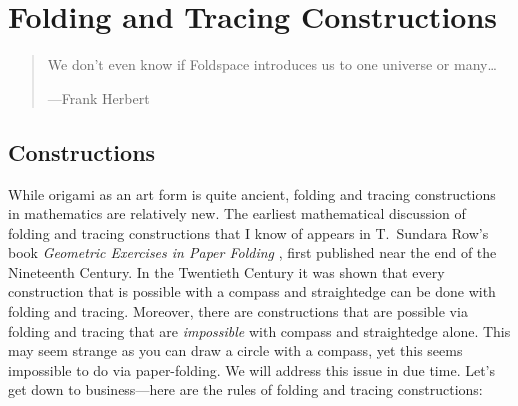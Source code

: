 \chapter{Folding and Tracing Constructions}
\begin{quote} 
We don't even know if Foldspace introduces us to one universe or
many\dots

\hfill---Frank Herbert
\end{quote}

\section{Constructions}

While origami as an art form is quite ancient, folding and tracing constructions
in mathematics are relatively new. The earliest mathematical
discussion of folding and tracing constructions that I know of appears in
T.\ Sundara Row's book \textit{Geometric Exercises in Paper Folding}
\cite{row}, first published near the end of the Nineteenth Century. In
the Twentieth Century it was shown that every construction that is
possible with a compass and straightedge can be done with
folding and tracing. Moreover, there are constructions that are possible via
folding and tracing that are \textit{impossible} with compass and straightedge
alone. This may seem strange as you can draw a circle with a compass,
yet this seems impossible to do via paper-folding. We will address
this issue in due time. Let's get down to business---here are the
rules of folding and tracing constructions:


